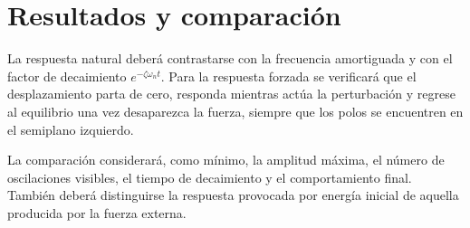 \section{Resultados y comparación}

La respuesta natural deberá contrastarse con la frecuencia amortiguada y con el factor de decaimiento $e^{-\zeta\omega_nt}$. Para la respuesta forzada se verificará que el desplazamiento parta de cero, responda mientras actúa la perturbación y regrese al equilibrio una vez desaparezca la fuerza, siempre que los polos se encuentren en el semiplano izquierdo.

La comparación considerará, como mínimo, la amplitud máxima, el número de oscilaciones visibles, el tiempo de decaimiento y el comportamiento final. También deberá distinguirse la respuesta provocada por energía inicial de aquella producida por la fuerza externa.


